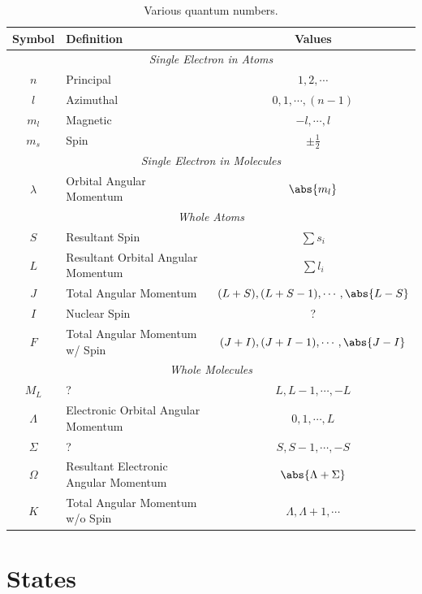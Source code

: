 \documentclass[11pt, twoside, fleqn]{report}
\begin{document}
\begin{table}[H]
    \centering
    \caption{Various quantum numbers.}
    \label{t:quantum_numbers}
    \begin{tabular}{clc}
        \toprule
        Symbol & Definition & Values \\
        \midrule
        \multicolumn{3}{c}{\textit{Single Electron in Atoms}} \\
        \cmidrule(lr){1-3}
        $n$ & Principal & $1, 2, \dotsb$ \\
        $l$ & Azimuthal & $0, 1, \dotsb, (n - 1)$ \\
        $m_l$ & Magnetic & $-l, \dotsb, l$ \\
        $m_s$ & Spin & $\pm \frac{1}{2}$ \\
        \multicolumn{3}{c}{\textit{Single Electron in Molecules}} \\
        \cmidrule(lr){1-3}
        $\lambda$ & Orbital Angular Momentum & $\abs{m_l}$ \\
        \multicolumn{3}{c}{\textit{Whole Atoms}} \\
        \cmidrule(lr){1-3}
        $S$ & Resultant Spin & $\sum s_i$ \\
        $L$ & Resultant Orbital Angular Momentum & $\sum l_i$ \\
        $J$ & Total Angular Momentum & $(L + S), (L + S - 1), \dotsb, \abs{L - S}$ \\
        $I$ & Nuclear Spin & ? \\
        $F$ & Total Angular Momentum w/ Spin & $(J + I), (J + I - 1), \dotsb, \abs{J - I}$ \\
        \multicolumn{3}{c}{\textit{Whole Molecules}} \\
        \cmidrule(lr){1-3}
        $M_L$ & ? & $L, L - 1, \dotsb, -L$ \\
        $\Lambda$ & Electronic Orbital Angular Momentum & $0, 1, \dotsb, L$ \\
        $\Sigma$ & ? & $S, S - 1, \dotsb, -S$ \\
        $\Omega$ & Resultant Electronic Angular Momentum & $\abs{\Lambda + \Sigma}$ \\
        $K$ & Total Angular Momentum w/o Spin & $\Lambda, \Lambda + 1, \dotsb$ \\
        \bottomrule
    \end{tabular}
\end{table}

\chapter{States}
\label{a:states}
\end{document}
